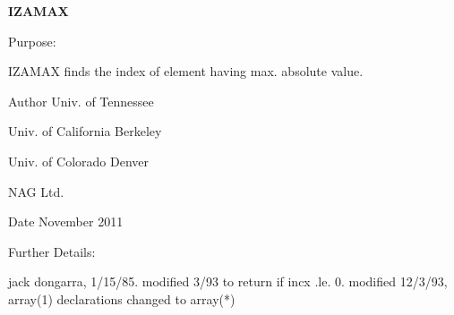 {\bfseries I\+Z\+A\+M\+A\+X} 

\begin{DoxyParagraph}{Purpose\+: }
\begin{DoxyVerb}    IZAMAX finds the index of element having max. absolute value.\end{DoxyVerb}
 
\end{DoxyParagraph}
\begin{DoxyAuthor}{Author}
Univ. of Tennessee 

Univ. of California Berkeley 

Univ. of Colorado Denver 

N\+A\+G Ltd. 
\end{DoxyAuthor}
\begin{DoxyDate}{Date}
November 2011 
\end{DoxyDate}
\begin{DoxyParagraph}{Further Details\+: }
\begin{DoxyVerb}     jack dongarra, 1/15/85.
     modified 3/93 to return if incx .le. 0.
     modified 12/3/93, array(1) declarations changed to array(*)\end{DoxyVerb}
 
\end{DoxyParagraph}
